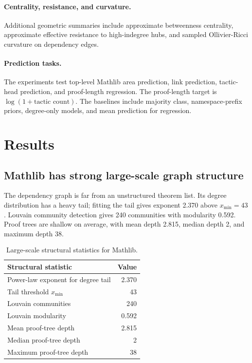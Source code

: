 \documentclass[11pt]{article}
\begin{document}
\paragraph{Centrality, resistance, and curvature.}
Additional geometric summaries include approximate betweenness centrality,
approximate effective resistance to high-indegree hubs, and sampled
Ollivier-Ricci curvature on dependency edges.

\paragraph{Prediction tasks.}
The experiments test top-level Mathlib area prediction, link prediction,
tactic-head prediction, and proof-length regression. The proof-length target is
$\log(1+\text{tactic count})$. The baselines include majority class,
namespace-prefix priors, degree-only models, and mean prediction for
regression.

\section{Results}

\subsection{Mathlib has strong large-scale graph structure}

The dependency graph is far from an unstructured theorem list. Its degree
distribution has a heavy tail; fitting the tail gives exponent 2.370 above
$x_{\min}=43$. Louvain community detection gives 240 communities with modularity
0.592. Proof trees are shallow on average, with mean depth 2.815, median depth
2, and maximum depth 38.

\begin{table}[h]
\centering
\begin{tabular}{lr}
\toprule
Structural statistic & Value \\
\midrule
Power-law exponent for degree tail & 2.370 \\
Tail threshold $x_{\min}$ & 43 \\
Louvain communities & 240 \\
Louvain modularity & 0.592 \\
Mean proof-tree depth & 2.815 \\
Median proof-tree depth & 2 \\
Maximum proof-tree depth & 38 \\
\bottomrule
\end{tabular}
\caption{Large-scale structural statistics for Mathlib.}
\end{table}
\end{document}
